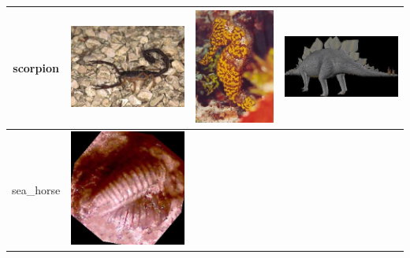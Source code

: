 \documentclass{article}
\begin{document}
\begin{table}[Ht]
\begin{tabular}{| c | c | c | c |}
\hline
scorpion &
\vspace{0cm}\includegraphics[scale=.15]{"Figures/Best Matches/bestmatch_c3"} &
\vspace{0cm}\includegraphics[scale=.15]{"Figures/False Matches/class_3_most_sure_wrong"} &
\vspace{0cm}\includegraphics[scale=.15]{"Figures/False Matches/class_3_least_sure_wrong"} \\
\hline
sea\_horse &
\vspace{0cm}\includegraphics[scale=.15]{"Figures/Best Matches/bestmatch_c4"} &

\end{tabular}
\end{table}
\end{document}
